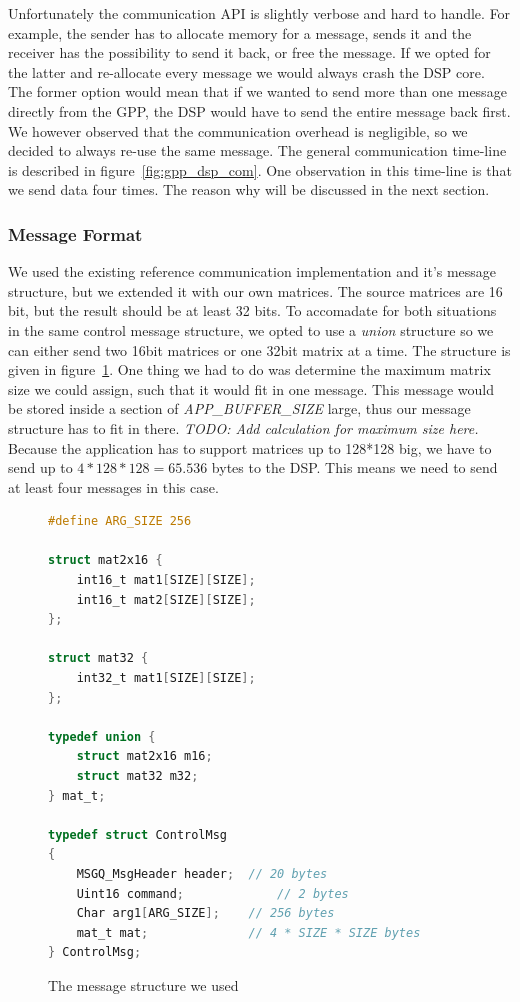 Unfortunately the communication API is slightly verbose and hard to handle.
For example, the sender has to allocate memory for a message, sends it and the
receiver has the possibility to send it back, or free the message. If we opted
for the latter and re-allocate every message we would always crash the DSP core.
The former option would mean that if we wanted to send more than one message
directly from the GPP, the DSP would have to send the entire message back first.
We however observed that the communication overhead is negligible, so we
decided to always re-use the same message. The general communication time-line
is described in figure~\ref{fig:gpp_dsp_com}. One observation in this time-line
is that we send data four times. The reason why will be discussed in the next
section.

\subsubsection{Message Format}
We used the existing reference communication implementation and it's message
structure, but we extended it with our own matrices. The source matrices are
16 bit, but the result should be at least 32 bits. To accomadate for both 
situations in the same control message structure, we opted to use a 
\emph{union} structure so we can either send two 16bit matrices or one 
32bit matrix at a time. The structure is given in 
figure~\ref{code:control_msg}. One thing we had to do was determine the maximum
matrix size we could assign, such that it would fit in one message. This
message would be stored inside a section of \emph{APP\_BUFFER\_SIZE} large, thus
our message structure has to fit in there. 
\emph{TODO: Add calculation for maximum size here.}
Because the application has to support matrices up to 128*128 big, we have to
send up to $4*128*128 = 65.536$ bytes to the DSP. This means we need to send
at least four messages in this case. 

\begin{figure}[h]
\begin{lstlisting}[language=C]
#define ARG_SIZE 256

struct mat2x16 {
	int16_t mat1[SIZE][SIZE];
	int16_t mat2[SIZE][SIZE];
};

struct mat32 {
	int32_t mat1[SIZE][SIZE];
};

typedef union {
	struct mat2x16 m16;
	struct mat32 m32;
} mat_t;

typedef struct ControlMsg
{
    MSGQ_MsgHeader header;	// 20 bytes
    Uint16 command;				// 2 bytes
    Char arg1[ARG_SIZE];	// 256 bytes
    mat_t mat;				// 4 * SIZE * SIZE bytes
} ControlMsg;
\end{lstlisting}
\caption{The message structure we used}
\label{code:control_msg}
\end{figure}
